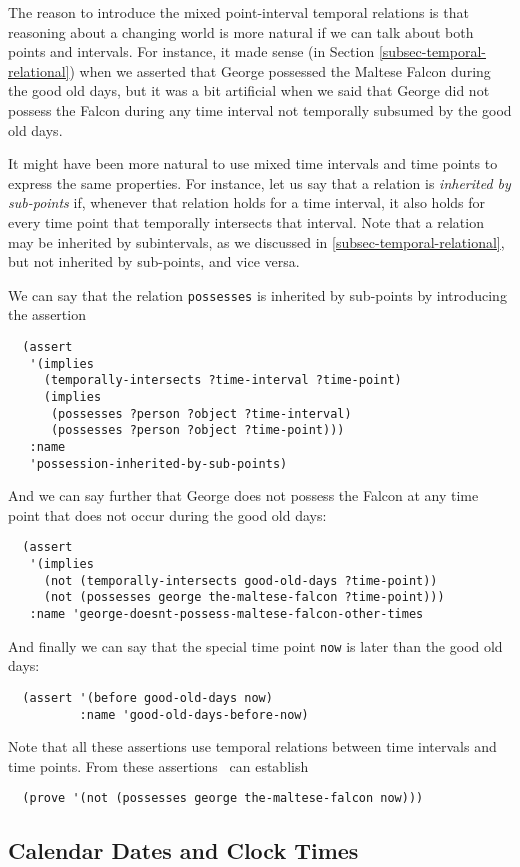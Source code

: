 The reason to introduce the mixed point-interval temporal relations is that
reasoning about a changing world is more natural if we can talk about both
points and intervals.  For instance, it made sense (in Section
\ref{subsec-temporal-relational}) when we asserted that George possessed the
Maltese Falcon during the good old days, but it was a bit artificial when we
said that
 George did not possess the Falcon during any time interval not
temporally subsumed by the good old days.

It might have been more natural to use mixed time intervals and time points
to express the same properties.  For instance, let us say that a relation
is {\em inherited by sub-points}  if, whenever that relation holds for a
time interval, it also holds for every time point that  temporally intersects
that interval.  Note that a relation may be inherited by subintervals, as
we discussed in  \ref{subsec-temporal-relational}, but not inherited by
sub-points, and vice versa.

 We can say that the relation {\tt possesses} is inherited by
sub-points by introducing the assertion
\begin{verbatim}
  (assert
   '(implies
     (temporally-intersects ?time-interval ?time-point)
     (implies
      (possesses ?person ?object ?time-interval)
      (possesses ?person ?object ?time-point)))
   :name
   'possession-inherited-by-sub-points)
\end{verbatim}
And we can say further that George does not possess the Falcon at any time
point that does not occur during the good old days:
\begin{verbatim}
  (assert
   '(implies
     (not (temporally-intersects good-old-days ?time-point))
     (not (possesses george the-maltese-falcon ?time-point)))
   :name 'george-doesnt-possess-maltese-falcon-other-times
\end{verbatim}
And finally we can say that the special time point {\tt now} is later than
the good old days:
\begin{verbatim}
  (assert '(before good-old-days now)
          :name 'good-old-days-before-now)
\end{verbatim}
Note that all these assertions use temporal relations between time intervals
and time points.  From these assertions \snark\   can establish
\begin{verbatim}
  (prove '(not (possesses george the-maltese-falcon now)))
\end{verbatim}

\subsection{Calendar Dates and Clock Times}

